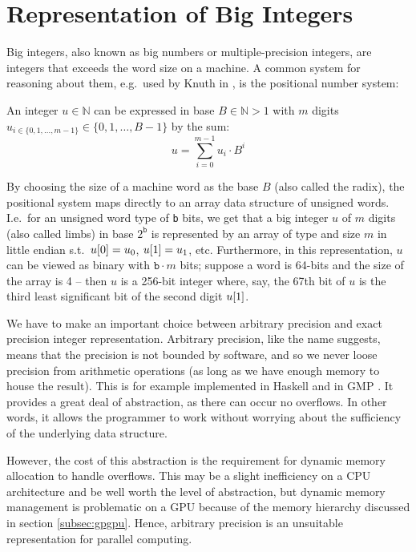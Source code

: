 \section{Representation of Big Integers}
\label{sec:big}
Big integers, also known as big numbers or multiple-precision integers, are
integers that exceeds the word size on a machine. A common system for reasoning
about them, e.g.\ used by Knuth in \cite{knuth97}, is the positional number
system:

\begin{definition}\label{def:bigints}
  An integer $u \in \mathbb{N}$ can be expressed in base $B \in \mathbb{N}>1$ with
  $m$ digits $u_{i\in \{0,1,\ldots,m-1\}}\in\{0,1,\ldots,B-1\}$ by the sum:
  \begin{equation}
\label{eq:rep}
u = \sum_{i=0}^{m-1}u_i\cdot B^{i}
\end{equation}
\end{definition}

By choosing the size of a machine word as the base $B$ (also called the radix),
the positional system maps directly to an array data structure of unsigned
words. I.e.\ for an unsigned word type \uint{} of \texttt{b} bits, we get that a
big integer $u$ of $m$ digits (also called limbs) in base $2^{\mathtt{b}}$ is
represented by an array of type \uint{} and size $m$ in little endian s.t.\
$u\mathtt{[}0\mathtt{]} = u_0$, $u\mathtt{[}1\mathtt{]} = u_1$, etc. Furthermore, in this
representation, $u$ can be viewed as binary with ${\mathtt{b}\cdot m}$ bits; suppose
a word is 64-bits and the size of the array is 4 -- then $u$ is a 256-bit integer
where, say, the 67th bit of $u$ is the third least significant bit of the second
digit $u\mathtt{[}1\mathtt{]}$.

We have to make an important choice between arbitrary precision and exact
precision integer representation. Arbitrary precision, like the name suggests,
means that the precision is not bounded by software, and so we never loose
precision from arithmetic operations (as long as we have enough memory to house
the result). This is for example implemented in Haskell and in GMP
\cite{marlow2010haskell,GMP}. It provides a great deal of abstraction, as there
can occur no overflows. In other words, it allows the programmer to work without
worrying about the sufficiency of the underlying data structure.

However, the cost of this abstraction is the requirement for dynamic memory
allocation to handle overflows. This may be a slight inefficiency on a CPU
architecture and be well worth the level of abstraction, but dynamic memory
management is problematic on a GPU because of the memory hierarchy discussed in
section \ref{subsec:gpgpu}. Hence, arbitrary precision is an unsuitable
representation for parallel computing.

